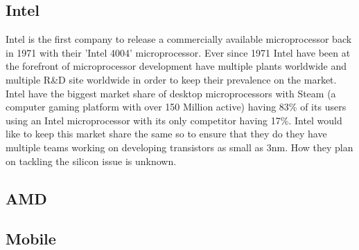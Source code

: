 \documentclass[journal]{IEEEtran}
\begin{document}
\subsection{Intel}
Intel is the first company to release a commercially available microprocessor back in 1971 with their 'Intel 4004' microprocessor. Ever since 1971 Intel have been at the forefront of microprocessor development have multiple plants worldwide and multiple R\&D site worldwide in order to keep their prevalence on the market. Intel have the biggest market share of desktop microprocessors with Steam (a computer gaming platform with over 150 Million active) having 83\% of its users using an Intel microprocessor with its only competitor having 17\%. Intel would like to keep this market share the same so to ensure that they do they have multiple teams working on developing transistors as small as 3nm. How they plan on tackling the silicon issue is unknown.

\subsection{AMD}

\subsection{Mobile}


\printbibliography
\end{document}
